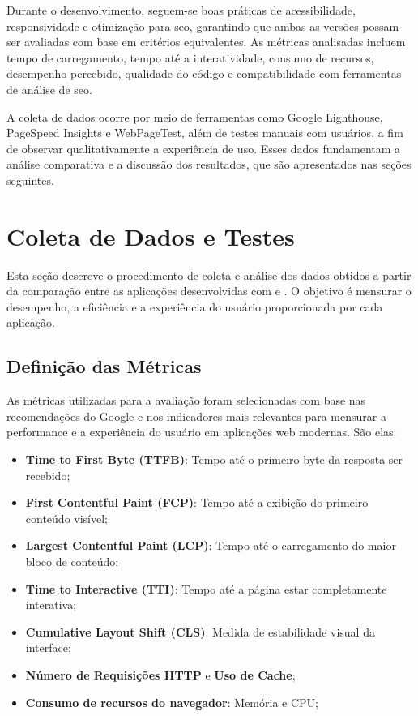 Durante o desenvolvimento, seguem-se boas práticas de acessibilidade, responsividade e otimização para \acrshort{seo}, garantindo que ambas as versões possam ser avaliadas com base em critérios equivalentes. As métricas analisadas incluem tempo de carregamento, tempo até a interatividade, consumo de recursos, desempenho percebido, qualidade do código e compatibilidade com ferramentas de análise de \acrshort{seo}.

A coleta de dados ocorre por meio de ferramentas como Google Lighthouse, PageSpeed Insights e WebPageTest, além de testes manuais com usuários, a fim de observar qualitativamente a experiência de uso. Esses dados fundamentam a análise comparativa e a discussão dos resultados, que são apresentados nas seções seguintes.
\section{Coleta de Dados e Testes}
\label{sec:coleta-de-dados-e-testes}

Esta seção descreve o procedimento de coleta e análise dos dados obtidos a partir da comparação entre as aplicações desenvolvidas com  e . O objetivo é mensurar o desempenho, a eficiência e a experiência do usuário proporcionada por cada aplicação.

\subsection{Definição das Métricas}

As métricas utilizadas para a avaliação foram selecionadas com base nas recomendações do Google e nos indicadores mais relevantes para mensurar a performance e a experiência do usuário em aplicações web modernas. São elas:

\begin{itemize}
    \item \textbf{Time to First Byte (TTFB)}: Tempo até o primeiro byte da resposta ser recebido;
    \item \textbf{First Contentful Paint (FCP)}: Tempo até a exibição do primeiro conteúdo visível;
    \item \textbf{Largest Contentful Paint (LCP)}: Tempo até o carregamento do maior bloco de conteúdo;
    \item \textbf{Time to Interactive (TTI)}: Tempo até a página estar completamente interativa;
    \item \textbf{Cumulative Layout Shift (CLS)}: Medida de estabilidade visual da interface;
    \item \textbf{Número de Requisições HTTP} e \textbf{Uso de Cache};
    \item \textbf{Consumo de recursos do navegador}: Memória e CPU;
\end{itemize}


